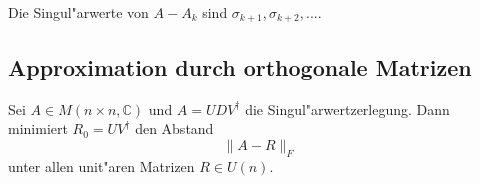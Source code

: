 \documentclass[9pt, a4paper, twocolumn, landscape]{article}
\begin{document}
{\begin{remark}
Die Singul"arwerte von $A - A_k$ sind $\sigma_{k+1}, \sigma_{k+2}, ... .$
\end{remark}

\subsection{Approximation durch orthogonale Matrizen}
\begin{theorem}
Sei $A \in M(n \times n, \mathbb{C})$ und $A = UDV^\dagger$ die Singul"arwertzerlegung. Dann minimiert $R_0 = UV^\dagger$ den Abstand 
$$
\|A - R\|_F
$$
unter allen unit"aren Matrizen $R \in U(n)$.
\end{theorem}
}
\end{document}

